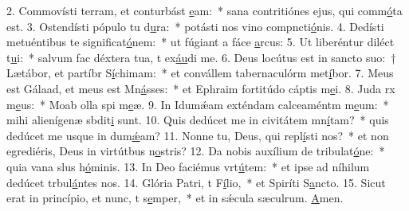 2. Commovísti terram, et conturbást \uline{e}am:~* sana contritiónes ejus, qui comm\uline{ó}ta est.
3. Ostendísti pópulo tu d\uline{u}ra:~* potásti nos vino compncti\uline{ó}nis.
4. Dedísti metuéntibus te significat\uline{ó}nem:~* ut fúgiant a fáce \uline{a}rcus:
5. Ut liberéntur diléct t\uline{u}i:~* salvum fac déxtera tua, t ex\uline{áu}di me.
6. Deus locútus est in sancto suo:~† Lætábor, et partíbr S\uline{í}chimam:~* et convállem tabernaculórm met\uline{í}bor.
7. Meus est Gálaad, et meus est Mn\uline{á}sses:~* et Ephraim fortitúdo cáptis m\uline{e}i.
8. Juda rx m\uline{e}us:~* Moab olla spi m\uline{e}æ.
9. In Idumǽam exténdam calceaméntm m\uline{e}um:~* mihi alienígenæ sbdit\uline{i} sunt.
10. Quis dedúcet me in civitátem mn\uline{í}tam?~* quis dedúcet me usque in dum\uline{ǽ}am?
11. Nonne tu, Deus, qui repl\uline{í}sti nos?~* et non egrediéris, Deus in virtútbus n\uline{o}stris?
12. Da nobis auxílium de tribulat\uline{ó}ne:~* quia vana slus h\uline{ó}minis.
13. In Deo faciémus vrt\uline{ú}tem:~* et ipse ad níhilum dedúcet trbul\uline{á}ntes nos.
14. Glória Patri, t F\uline{í}lio,~* et Spiríti S\uline{a}ncto.
15. Sicut erat in princípio, et nunc, t s\uline{e}mper,~* et in sǽcula sæculrum. \uline{A}men.
